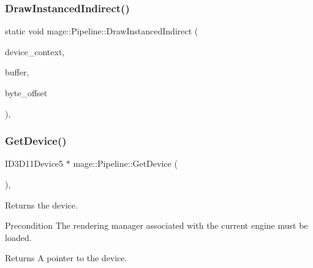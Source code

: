 \hypertarget{structmage_1_1_pipeline_a7140cbf6b635336a63cfbe7e8a1bc8cd}{}\label{structmage_1_1_pipeline_a7140cbf6b635336a63cfbe7e8a1bc8cd} 
\subsubsection{\texorpdfstring{Draw\+Instanced\+Indirect()}{DrawInstancedIndirect()}}
{\footnotesize\ttfamily static void mage\+::\+Pipeline\+::\+Draw\+Instanced\+Indirect (\begin{DoxyParamCaption}\item[{I\+D3\+D11\+Device\+Context4 $\ast$}]{device\+\_\+context,  }\item[{I\+D3\+D11\+Buffer $\ast$}]{buffer,  }\item[{\hyperlink{namespacemage_a41c104c036fba3756a74e19f793eeaa1}{U32}}]{byte\+\_\+offset }\end{DoxyParamCaption})\hspace{0.3cm}{\ttfamily [static]}, {\ttfamily [noexcept]}}

\hypertarget{structmage_1_1_pipeline_a106ef812d342b6f9afc52976eb67f136}{}\label{structmage_1_1_pipeline_a106ef812d342b6f9afc52976eb67f136} 
\subsubsection{\texorpdfstring{Get\+Device()}{GetDevice()}}
{\footnotesize\ttfamily I\+D3\+D11\+Device5 $\ast$ mage\+::\+Pipeline\+::\+Get\+Device (\begin{DoxyParamCaption}{ }\end{DoxyParamCaption})\hspace{0.3cm}{\ttfamily [static]}, {\ttfamily [noexcept]}}

Returns the device.

\begin{DoxyPrecond}{Precondition}
The rendering manager associated with the current engine must be loaded. 
\end{DoxyPrecond}
\begin{DoxyReturn}{Returns}
A pointer to the device. 
\end{DoxyReturn}
\hypertarget{structmage_1_1_pipeline_a627116ca4b8d77277c5aae0b986eddeb}{}\label{structmage_1_1_pipeline_a627116ca4b8d77277c5aae0b986eddeb} 
